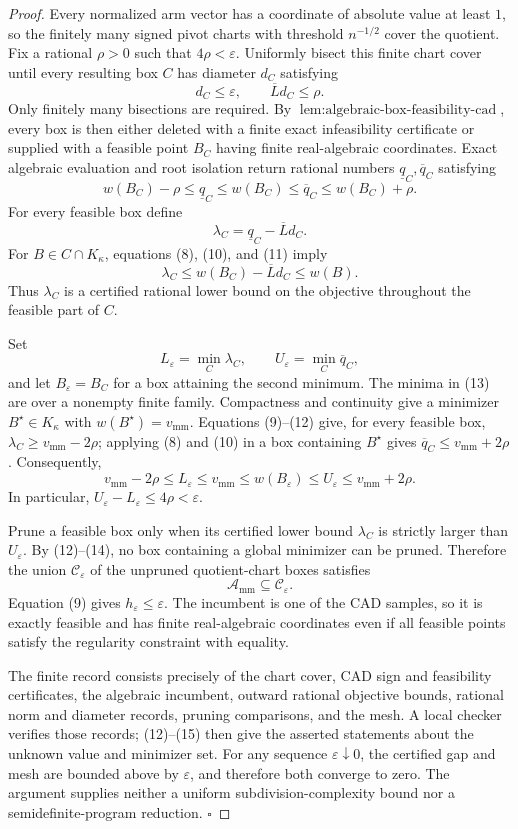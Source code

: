 \documentclass{article}
\begin{document}
\begin{proof}
Every normalized arm vector has a coordinate of absolute value at least \(1\), so the finitely many signed pivot charts with threshold \(n^{-1/2}\) cover the quotient.  Fix a rational \(\rho>0\) such that \(4\rho<\varepsilon\).  Uniformly bisect this finite chart cover until every resulting box \(C\) has diameter \(d_C\) satisfying
\[
d_C\le\varepsilon,
\qquad
\overline Ld_C\le\rho.
\tag{9}
\]
Only finitely many bisections are required.  By \(\operatorname{lem{:}algebraic\mbox{-}box\mbox{-}feasibility\mbox{-}cad}\), every box is then either deleted with a finite exact infeasibility certificate or supplied with a feasible point \(B_C\) having finite real-algebraic coordinates.  Exact algebraic evaluation and root isolation return rational numbers \(\underline q_C,\overline q_C\) satisfying
\[
w(B_C)-\rho\le\underline q_C\le w(B_C)
\le\overline q_C\le w(B_C)+\rho.
\tag{10}
\]
For every feasible box define
\[
\lambda_C=\underline q_C-\overline Ld_C.
\tag{11}
\]
For \(B\in C\cap K_\kappa\), equations (8), (10), and (11) imply
\[
\lambda_C
\le w(B_C)-\overline Ld_C
\le w(B).
\tag{12}
\]
Thus \(\lambda_C\) is a certified rational lower bound on the objective throughout the feasible part of \(C\).

Set
\[
L_\varepsilon=\min_C\lambda_C,
\qquad
U_\varepsilon=\min_C\overline q_C,
\tag{13}
\]
and let \(B_\varepsilon=B_C\) for a box attaining the second minimum.  The minima in (13) are over a nonempty finite family.  Compactness and continuity give a minimizer \(B^\star\in K_\kappa\) with \(w(B^\star)=v_{\mathrm{mm}}\).  Equations (9)--(12) give, for every feasible box, \(\lambda_C\ge v_{\mathrm{mm}}-2\rho\); applying (8) and (10) in a box containing \(B^\star\) gives \(\overline q_C\le v_{\mathrm{mm}}+2\rho\).  Consequently,
\[
v_{\mathrm{mm}}-2\rho
\le L_\varepsilon
\le v_{\mathrm{mm}}
\le w(B_\varepsilon)
\le U_\varepsilon
\le v_{\mathrm{mm}}+2\rho.
\tag{14}
\]
In particular, \(U_\varepsilon-L_\varepsilon\le4\rho<\varepsilon\).

Prune a feasible box only when its certified lower bound \(\lambda_C\) is strictly larger than \(U_\varepsilon\).  By (12)--(14), no box containing a global minimizer can be pruned.  Therefore the union \(\mathcal C_\varepsilon\) of the unpruned quotient-chart boxes satisfies
\[
\mathcal A_{\mathrm{mm}}\subseteq\mathcal C_\varepsilon.
\tag{15}
\]
Equation (9) gives \(h_\varepsilon\le\varepsilon\).  The incumbent is one of the CAD samples, so it is exactly feasible and has finite real-algebraic coordinates even if all feasible points satisfy the regularity constraint with equality.

The finite record consists precisely of the chart cover, CAD sign and feasibility certificates, the algebraic incumbent, outward rational objective bounds, rational norm and diameter records, pruning comparisons, and the mesh.  A local checker verifies those records; (12)--(15) then give the asserted statements about the unknown value and minimizer set.  For any sequence \(\varepsilon\downarrow0\), the certified gap and mesh are bounded above by \(\varepsilon\), and therefore both converge to zero.  The argument supplies neither a uniform subdivision-complexity bound nor a semidefinite-program reduction. \(\square\)
\end{proof}
\end{document}
